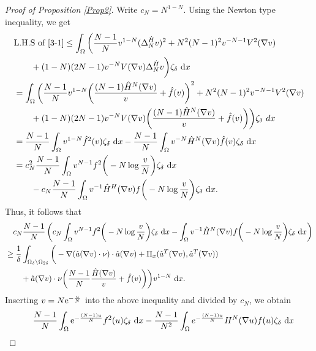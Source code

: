 \documentclass[reqno, 11pt]{amsart} %
\numberwithin{equation}{section}
\theoremstyle{definition}
\newcommand{\e}{\textup{e}}
\newcommand{\dx}{\textup{d}x}
\begin{document}
\begin{proof}[Proof of Proposition \ref{Prop2}]
    Write $c_N = N^{1-N}$. Using the Newton type inequality, we get
    \begin{align*}
        & \text{L.H.S of \eqref{3-1}}  \leq \int_{\Omega} \bigg( \frac{N-1}{N} v^{1-N} (\Delta_N^{\hat{H}} v)^2 +  N^2(N-1)^2 v^{-N-1} V^2(\nabla v) \\
        &\qquad + (1-N)(2N-1)v^{-N} V(\nabla v) \Delta_N^{\hat{H}} v \bigg) \zeta_{\delta} \ \dx\\
        & = \int_{\Omega} \bigg( \frac{N-1}{N} v^{1-N} \bigg( \frac{(N-1)\hat{H}^N(\nabla v)}{v} + \hat{f}(v) \bigg)^2 +  N^2(N-1)^2 v^{-N-1} V^2(\nabla v) \\
        & \qquad + (1- N)(2N-1)v^{-N} V(\nabla v) \bigg(\frac{(N-1)\hat{H}^N(\nabla v)}{v} + \hat{f}(v)\bigg) \bigg) \zeta_{\delta} \ dx\\
        & = \frac{N-1}{N} \int_{\Omega} v^{1-N} \hat{f}^2(v) \zeta_{\delta} \ \dx - \frac{N-1}{N} \int_{\Omega}v^{-N} \hat{H}^{N}(\nabla v) \hat{f}(v) \zeta_{\delta} \ \dx \\
        & = c_N^2 \frac{N-1}{N} \int_{\Omega} v^{N-1} f^2\bigg( - N \log \frac{v}{N} \bigg) \zeta_{\delta} \ \dx \\
        & \qquad - c_N \frac{N-1}{N} \int_{\Omega} v^{-1} \hat{H}^{H}(\nabla v) f\bigg( - N \log \frac{v}{N} \bigg) \zeta_{\delta} \ \dx.
    \end{align*}
    Thus, it follows that
    \begin{align*}
        &\quad c_N \frac{N-1}{N} \left( c_N\int_{\Omega} v^{N-1} f^2\bigg( - N \log \frac{v}{N} \bigg) \zeta_{\delta} \ \dx - \int_{\Omega} v^{-1} \hat{H}^{N}(\nabla v) f\bigg( - N \log \frac{v}{N} \bigg) \zeta_{\delta} \ \dx \right) \\
        & \geq \frac{1}{\delta} \int_{\Omega_{\delta} \backslash \Omega_{2 \delta}} \bigg( - \nabla(\hat{a}(\nabla v) \cdot \nu) \cdot \hat{a}(\nabla v) + \Pi _x(\hat{a}^T(\nabla v), \hat{a}^T(\nabla v)) \\
        & \qquad + \hat{a}(\nabla v)\cdot \nu \bigg( \frac{N-1}{N} \frac{\hat{H}(\nabla v)}{v} + \hat{f}(v)\bigg)\bigg) v^{1-N} \ \dx.
    \end{align*}
    Inserting $v = N \e^{-\frac{u}{N}}$ into the above inequality and divided by $c_N$, we obtain
    \begin{align}
        & \quad \frac{N-1}{N} \int_{\Omega} \e^{-\frac{(N-1)u}{N}} f^2(u) \zeta_{\delta} \ \dx - \frac{N-1}{N^2} \int_{\Omega} e^{-\frac{(N-1)u}{N}} H^{N}(\nabla u) f(u) \zeta_{\delta} \ \dx \nonumber \\

\end{align}
\end{proof}
\end{document}
